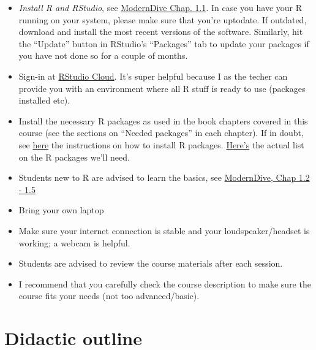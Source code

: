 \documentclass[
  letterpaper,
  DIV=11,
  numbers=noendperiod]{scrreprt}
\theoremstyle{definition}
\theoremstyle{definition}
\theoremstyle{remark}
\begin{document}
\begin{itemize}
\item
  \emph{Install R and RStudio}, see
  \href{https://moderndive.com/1-getting-started.html\#r-rstudio}{ModernDive
  Chap. 1.1}. In case you have your R running on your system, please
  make sure that you're uptodate. If outdated, download and install the
  most recent versions of the software. Similarly, hit the ``Update''
  button in RStudio's ``Packages'' tab to update your packages if you
  have not done so for a couple of months.
\item
  Sign-in at \href{https://login.rstudio.cloud/}{RStudio Cloud}. It's
  super helpful because I as the techer can provide you with an
  environment where all R stuff is ready to use (packages installed
  etc).
\item
  Install the necessary R packages as used in the book chapters covered
  in this course (see the sections on ``Needed packages'' in each
  chapter). If in doubt, see
  \href{https://moderndive.com/1-getting-started.html\#packages}{here}
  the instructions on how to install R packages.
  \protect\hyperlink{packages}{Here's} the actual list on the R packages
  we'll need.
\item
  Students new to R are advised to learn the basics, see
  \href{https://moderndive.com/1-getting-started.html\#code}{ModernDive,
  Chap 1.2 - 1.5}
\item
  Bring your own laptop
\item
  Make sure your internet connection is stable and your
  loudspeaker/headset is working; a webcam is helpful.
\item
  Students are advised to review the course materials after each
  session.
\item
  I recommend that you carefully check the course description to make
  sure the course fits your needs (not too advanced/basic).
\end{itemize}

\hypertarget{didactic-outline}{%
\section*{Didactic outline}\label{didactic-outline}}
\end{document}
